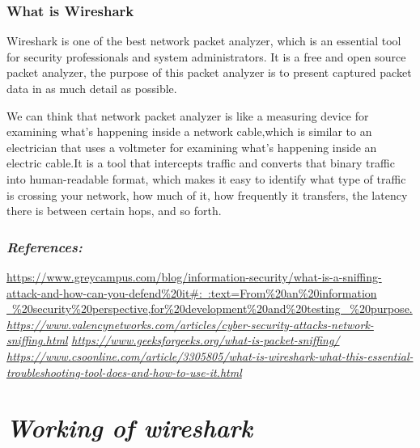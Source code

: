\documentclass[12pt, a4paper]{report}
\begin{document}
\subsection{What is Wireshark}

Wireshark is one of the best network packet analyzer, which is an
essential tool for security professionals and system administrators. It
is a free and open source packet analyzer, the purpose of this packet
analyzer is to present captured packet data in as much detail as
possible.

We can think that network packet analyzer is like a measuring device for
examining what's happening inside a network cable,which is similar to an
electrician that uses a voltmeter for examining what's happening inside
an electric cable.It is a tool that intercepts traffic and converts that
binary traffic into human-readable format, which makes it easy to
identify what type of traffic is crossing your network, how much of it,
how frequently it transfers, the latency there is between certain hops,
and so forth.

\subsection{\Large \emph{References: }}
\begin{flushleft}
\href{https://www.greycampus.com/blog/information-security/what-is-a-sniffing-attack-and-how-can-you-defend\%20it\#:~:text=From\%20an\%20information\%20security\%20perspective,for\%20development\%20and\%20testing\%20purpose.}{https://www.greycampus.com/blog/information-security/what-is-a-sniffing-attack-and-how-can-you-defend\%20it\#:~:text=From\%20an\%20information \ \%20security\%20perspective,for\%20development\%20and\%20testing \ \%20purpose.}
\bigbreak
\href{https://www.valencynetworks.com/articles/cyber-security-attacks-network-sniffing.html}{\emph{https://www.valencynetworks.com/articles/cyber-security-attacks-network-sniffing.html}}
\bigbreak
\href{https://www.geeksforgeeks.org/what-is-packet-sniffing/}{\emph{https://www.geeksforgeeks.org/what-is-packet-sniffing/}}
\bigbreak
\href{https://www.csoonline.com/article/3305805/what-is-wireshark-what-this-essential-troubleshooting-tool-does-and-how-to-use-it.html}{\emph{https://www.csoonline.com/article/3305805/what-is-wireshark-what-this-essential-troubleshooting-tool-does-and-how-to-use-it.html}}
\end{flushleft}
\chapter{\emph{Working of wireshark}}
\end{document}
